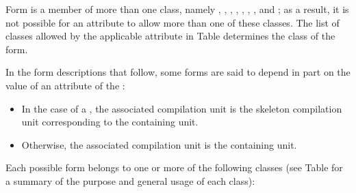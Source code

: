 Form \DWFORMsecoffsetTARG{} 
is a member of more than one class, namely 
\CLASSaddrptr,
\CLASSlineptr,
\CLASSloclist, \CLASSloclistsptr, 
\CLASSmacptr,
\CLASSrnglist{}, \CLASSrnglistsptr, 
and
\CLASSstroffsetsptr;
as a result, it is not possible for an
attribute to allow more than one of these classes.
The list of classes allowed by the applicable attribute in 
Table 
determines the class of the form.

In the form descriptions that follow, some forms are said
to depend in part on the value of an attribute of the
:
\begin{itemize}
\item
In the case of a \splitDWARFobjectfile{}, the associated
compilation unit is the skeleton compilation unit corresponding 
to the containing unit.
\item Otherwise, the associated compilation unit 
is the containing unit.
\end{itemize}

Each possible form belongs to one or more of the following classes
(see Table  for a summary of
the purpose and general usage of each class):

